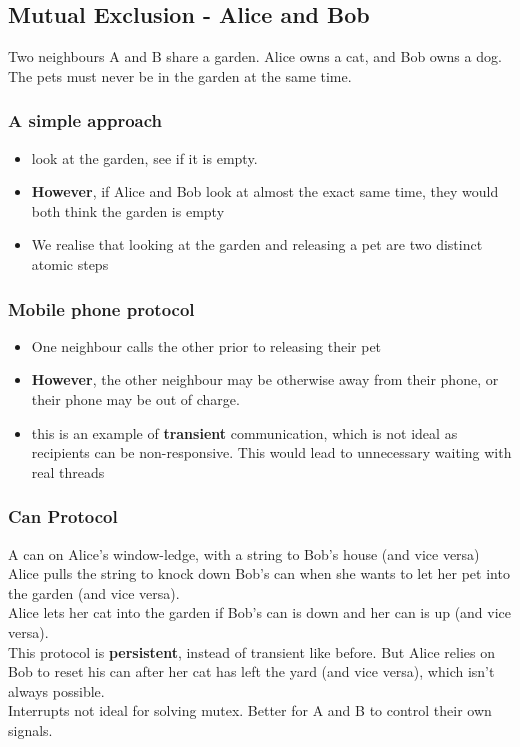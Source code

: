 \documentclass{article}
\begin{document}
\subsection{Mutual Exclusion - Alice and Bob}
Two neighbours A and B share a garden. Alice owns a cat, and Bob owns a dog. The pets must never be in the garden at the same time.
\subsubsection{A simple approach}
\begin{itemize}
    \item look at the garden, see if it is empty.
    \item \textbf{However}, if Alice and Bob look at almost the exact same time, they would both think the garden is empty
    \item We realise that looking at the garden and releasing a pet are two distinct atomic steps
\end{itemize}
\subsubsection{Mobile phone protocol}
\begin{itemize}
    \item One neighbour calls the other prior to releasing their pet
    \item \textbf{However}, the other neighbour may be otherwise away from their phone, or their phone may be out of charge. 
    \item this is an example of \textbf{transient} communication, which is not ideal as recipients can be non-responsive. This would lead to unnecessary waiting with real threads
\end{itemize}
\subsubsection{Can Protocol}
A can on Alice's window-ledge, with a string to Bob's house (and vice versa)
\\Alice pulls the string to knock down Bob's can when she wants to let her pet into the garden (and vice versa).
\\Alice lets her cat into the garden if Bob's can is down and her can is up (and vice versa).
\\This protocol is \textbf{persistent}, instead of transient like before. But Alice relies on Bob to reset his can after her cat has left the yard (and vice versa), which isn't always possible.
\\Interrupts not ideal for solving mutex. Better for A and B to control their own signals.
\end{document}
